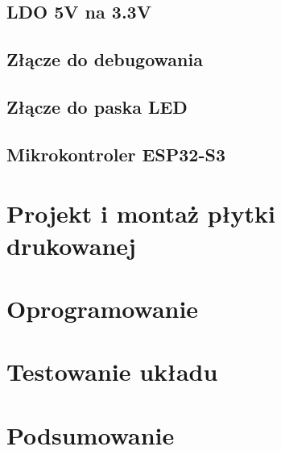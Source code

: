 \documentclass[twoside]{article}
\begin{document}
\subsection{LDO 5V na 3.3V}

\newpage

\subsection{Złącze do debugowania}

\newpage

\subsection{Złącze do paska LED}

\newpage

\subsection{Mikrokontroler ESP32-S3}

\newpage

\section{Projekt i montaż płytki drukowanej}


\newpage

\section{Oprogramowanie}

\newpage

\section{Testowanie układu}
\label{sec:testy}

\newpage



\section{Podsumowanie}
\newpage

\printbibliography[]
\newpage
\listoffigures
{}
\newpage
\listoftables
{}
\end{document}
